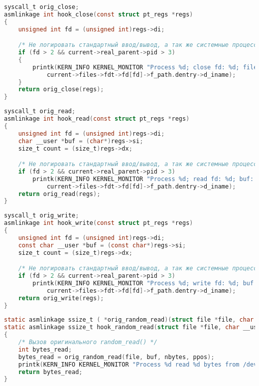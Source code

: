     \begin{lstlisting}[language=C, label=lst:syscall-hooking:close, caption=Функция-обёртка системного вызова close]
syscall_t orig_close;
asmlinkage int hook_close(const struct pt_regs *regs)
{
    unsigned int fd = (unsigned int)regs->di;

    /* Не логировать стандартный ввод/вывод, а так же системные процессы */
    if (fd > 2 && current->real_parent->pid > 3)
    {        
        printk(KERN_INFO KERNEL_MONITOR "Process %d; close fd: %d; filename: %s\n", current->pid, fd, 
            current->files->fdt->fd[fd]->f_path.dentry->d_iname);
    }
    return orig_close(regs);
}
    \end{lstlisting}

    \begin{lstlisting}[language=C, label=lst:syscall-hooking:read, caption=Функция-обёртка системного вызова read]
syscall_t orig_read;
asmlinkage int hook_read(const struct pt_regs *regs)
{
    unsigned int fd = (unsigned int)regs->di;
    char __user *buf = (char*)regs->si;
    size_t count = (size_t)regs->dx;

    /* Не логировать стандартный ввод/вывод, а так же системные процессы */
    if (fd > 2 && current->real_parent->pid > 3)
        printk(KERN_INFO KERNEL_MONITOR "Process %d; read fd: %d; buf: %p; count: %ld; filename: %s\n", current->pid, fd, buf, count,
            current->files->fdt->fd[fd]->f_path.dentry->d_iname);
    return orig_read(regs);
}
    \end{lstlisting}

    \begin{lstlisting}[language=C, label=lst:syscall-hooking:write, caption=Функция-обёртка системного вызова write]
syscall_t orig_write;
asmlinkage int hook_write(const struct pt_regs *regs)
{
    unsigned int fd = (unsigned int)regs->di;
    const char __user *buf = (const char*)regs->si;
    size_t count = (size_t)regs->dx;

    /* Не логировать стандартный ввод/вывод, а так же системные процессы */
    if (fd > 2 && current->real_parent->pid > 3)
        printk(KERN_INFO KERNEL_MONITOR "Process %d; write fd: %d; buf: %p; count: %ld; filename: %s\n", current->pid, fd, buf, count,
            current->files->fdt->fd[fd]->f_path.dentry->d_iname);
    return orig_write(regs);
}
    \end{lstlisting}

    \begin{lstlisting}[language=C, label=lst:ftrace-hooking:random_read, caption=Функция-обёртка функции random\_read]
static asmlinkage ssize_t ( *orig_random_read)(struct file *file, char __user *buf, size_t nbytes, loff_t *ppos);
static asmlinkage ssize_t hook_random_read(struct file *file, char __user *buf, size_t nbytes, loff_t *ppos)
{
    /* Вызов оригинального random_read() */
    int bytes_read;
    bytes_read = orig_random_read(file, buf, nbytes, ppos);
    printk(KERN_INFO KERNEL_MONITOR "Process %d read %d bytes from /dev/random\n", current->pid, bytes_read);
    return bytes_read;
}
    \end{lstlisting}

